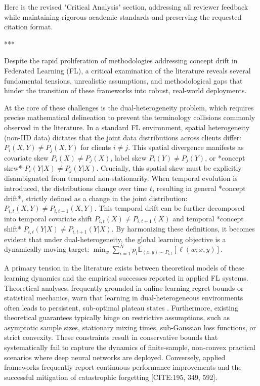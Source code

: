 \documentclass[journal]{IEEEtran}
\begin{document}
Here is the revised "Critical Analysis" section, addressing all reviewer feedback while maintaining rigorous academic standards and preserving the requested citation format.

***

Despite the rapid proliferation of methodologies addressing concept drift in Federated Learning (FL), a critical examination of the literature reveals several fundamental tensions, unrealistic assumptions, and methodological gaps that hinder the transition of these frameworks into robust, real-world deployments. 

At the core of these challenges is the dual-heterogeneity problem, which requires precise mathematical delineation to prevent the terminology collisions commonly observed in the literature. In a standard FL environment, spatial heterogeneity (non-IID data) dictates that the joint data distributions across clients differ: $P_i(X, Y) \neq P_j(X, Y)$ for clients $i \neq j$. This spatial divergence manifests as covariate skew $P_i(X) \neq P_j(X)$, label skew $P_i(Y) \neq P_j(Y)$, or *concept skew* $P_i(Y|X) \neq P_j(Y|X)$. Crucially, this spatial skew must be explicitly disambiguated from temporal non-stationarity. When temporal evolution is introduced, the distributions change over time $t$, resulting in general *concept drift*, strictly defined as a change in the joint distribution: $P_{i,t}(X, Y) \neq P_{i,t+1}(X, Y)$. This temporal drift can be further decomposed into temporal covariate shift $P_{i,t}(X) \neq P_{i,t+1}(X)$ and temporal *concept shift* $P_{i,t}(Y|X) \neq P_{i,t+1}(Y|X)$. By harmonizing these definitions, it becomes evident that under dual-heterogeneity, the global learning objective is a dynamically moving target: $\min_w \sum_{i=1}^N p_i \mathbb{E}_{(x,y) \sim P_{i,t}} [\ell(w; x,y)]$.

A primary tension in the literature exists between theoretical models of these learning dynamics and the empirical successes reported in applied FL systems. Theoretical analyses, frequently grounded in online learning regret bounds or statistical mechanics, warn that learning in dual-heterogeneous environments often leads to persistent, sub-optimal plateau states \cite{Straat2018}. Furthermore, existing theoretical guarantees typically hinge on restrictive assumptions, such as asymptotic sample sizes, stationary mixing times, sub-Gaussian loss functions, or strict convexity. These constraints result in conservative bounds that systematically fail to capture the dynamics of finite-sample, non-convex practical scenarios where deep neural networks are deployed. Conversely, applied frameworks frequently report continuous performance improvements and the successful mitigation of catastrophic forgetting [CITE:195, 349, 592]. 
\end{document}
